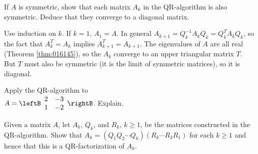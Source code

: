 \begin{multicols}{2}
\begin{ex}
If $A$ is symmetric, show that each matrix $A_{k}$ in the QR-algorithm is also symmetric. Deduce that they converge to a diagonal matrix.

\begin{sol}
Use induction on $k$. If $k = 1$, $A_{1} = A$. In general $A_{k+1} = Q_{k}^{-1}A_{k}Q_{k} = Q_{k}^{T}A_{k}Q_{k}$, so the fact that $A_{k}^{T} = A_{k}$ implies $A_{k+1}^{T} = A_{k+1}$. The eigenvalues of $A$ are all real (Theorem \ref{thm:016145}), so the $A_{k}$ converge to an upper triangular matrix $T$. But $T$ must also be symmetric (it is the limit of symmetric matrices), so it is diagonal.
\end{sol}
\end{ex}

\begin{ex}
Apply the QR-algorithm to \\ $A = \leftB \begin{array}{rr}
2 & -3 \\
1 & -2
\end{array}\rightB$. Explain.
\end{ex}

\begin{ex}
Given a matrix $A$, let $A_{k}$, $Q_{k}$, and $R_{k}$, $k \geq 1$, be the matrices constructed in the QR-algorithm. Show that $A_{k} = (Q_{1}Q_{2} \cdots Q_{k})(R_{k} \cdots R_{2}R_{1})$ for each $k \geq 1$ and hence that this is a QR-factorization of $A_{k}$. \newline [\textit{Hint}: Show that $Q_{k}R_{k} = R_{k-1}Q_{k-1}$ for each $k \geq 2$, and use this equality to compute $(Q_{1}Q_{2} \cdots Q_{k})(R_{k} \cdots R_{2}R_{1})$ ``from the centre out.'' Use the fact that $(AB)^{n+1} = A(BA)^{n}B$ for any square matrices $A$ and $B$.]
\end{ex}
\end{multicols}
